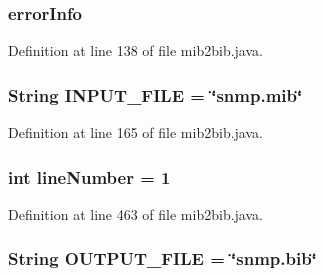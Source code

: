 \subsubsection[{error\+Info}]{ error\+Info\hspace{0.3cm}{\ttfamily [static]}}\label{classmib2bib_1_1mib2bib_aa4c971316b8cb6e0b77d1f82895b9e38}


Definition at line 138 of file mib2bib.\+java.

\hypertarget{classmib2bib_1_1mib2bib_a887665ab9e9d05b5aaae37f029f9a129}{}
\subsubsection[{I\+N\+P\+U\+T\+\_\+\+F\+I\+L\+E}]{\setlength{\rightskip}{0pt plus 5cm}String I\+N\+P\+U\+T\+\_\+\+F\+I\+L\+E = \char`\"{}snmp.\+mib\char`\"{}\hspace{0.3cm}{\ttfamily [static]}}\label{classmib2bib_1_1mib2bib_a887665ab9e9d05b5aaae37f029f9a129}


Definition at line 165 of file mib2bib.\+java.

\hypertarget{classmib2bib_1_1mib2bib_a44bf2f6ee91a35522c07c779325d3ef0}{}
\subsubsection[{line\+Number}]{\setlength{\rightskip}{0pt plus 5cm}int line\+Number = 1\hspace{0.3cm}{\ttfamily [static]}}\label{classmib2bib_1_1mib2bib_a44bf2f6ee91a35522c07c779325d3ef0}


Definition at line 463 of file mib2bib.\+java.

\hypertarget{classmib2bib_1_1mib2bib_a5c5d40d609cc4e4a4dc9d20f74f769ad}{}
\subsubsection[{O\+U\+T\+P\+U\+T\+\_\+\+F\+I\+L\+E}]{\setlength{\rightskip}{0pt plus 5cm}String O\+U\+T\+P\+U\+T\+\_\+\+F\+I\+L\+E = \char`\"{}snmp.\+bib\char`\"{}\hspace{0.3cm}{\ttfamily [static]}}\label{classmib2bib_1_1mib2bib_a5c5d40d609cc4e4a4dc9d20f74f769ad}



